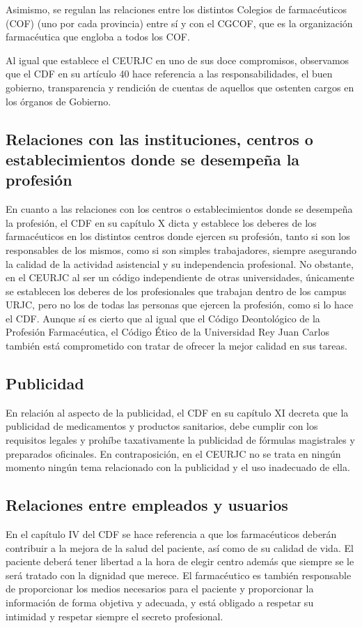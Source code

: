 \documentclass[11pt,a4paper]{article}
\begin{document}
Asimismo, se regulan las relaciones entre los distintos Colegios de farmacéuticos (COF) (uno por cada provincia) entre sí y con el CGCOF, que es la organización farmacéutica que engloba a todos los COF.

Al igual que establece el CEURJC en uno de sus doce compromisos, observamos que el CDF en su artículo 40 hace referencia a las responsabilidades, el buen gobierno, transparencia y rendición de cuentas de aquellos que ostenten cargos en los órganos de Gobierno.

\subsection{Relaciones con las instituciones, centros o establecimientos donde se desempeña la profesión} 
En cuanto a las relaciones con los centros o establecimientos donde se desempeña la profesión, el CDF en su capítulo X dicta y establece los deberes de los farmacéuticos en los distintos centros donde ejercen su profesión, tanto si son los responsables de los mismos, como si son simples trabajadores, siempre asegurando la calidad de la actividad asistencial y su independencia profesional. No obstante, en el CEURJC al ser un código independiente de otras universidades, únicamente se establecen los deberes de los profesionales que trabajan dentro de los campus URJC, pero no los de todas las personas que ejercen la profesión, como si lo hace el CDF. Aunque sí es cierto que al igual que el Código Deontológico de la Profesión Farmacéutica, el Código Ético de la Universidad Rey Juan Carlos también está comprometido con tratar de ofrecer la mejor calidad en sus tareas.

\subsection{Publicidad}
En relación al aspecto de la publicidad, el CDF en su capítulo XI decreta que la publicidad de medicamentos y productos sanitarios, debe cumplir con los requisitos legales y prohíbe taxativamente la publicidad de fórmulas magistrales y preparados oficinales. En contraposición, en el CEURJC  no se trata en ningún momento ningún tema relacionado con la publicidad y el uso inadecuado de ella.

\subsection{Relaciones entre empleados y usuarios}
En el capítulo IV del CDF se hace referencia a que los farmacéuticos deberán contribuir a la mejora de la salud del paciente, así como de su calidad de vida. El paciente deberá tener libertad a la hora de elegir centro además  que siempre se le será tratado con la dignidad que merece. El farmacéutico es también responsable de proporcionar los medios necesarios para el paciente y proporcionar la información de forma objetiva y adecuada, y está obligado a respetar su intimidad y respetar siempre el secreto profesional. 
\end{document}
